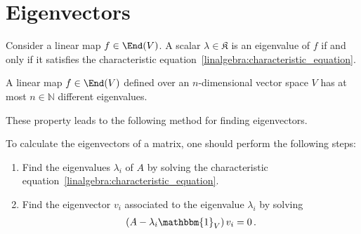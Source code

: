 \section{Eigenvectors}


    \begin{property}\label{linalgebra:eigenvalue_characteristic_equation}
        Consider a linear map $f\in\End(V)$. A scalar $\lambda\in\mathfrak{K}$ is an eigenvalue of $f$ if and only if it satisfies the characteristic equation~\eqref{linalgebra:characteristic_equation}.
    \end{property}
    \begin{property}
        A linear map $f\in\End(V)$ defined over an $n$-dimensional vector space $V$ has at most $n\in\mathbb{N}$ different eigenvalues.
    \end{property}

    These property leads to the following method for finding eigenvectors.
    \begin{method}
        To calculate the eigenvectors of a matrix, one should perform the following steps:
        \begin{enumerate}
            \item Find the eigenvalues $\lambda_i$ of $A$ by solving the characteristic equation~\eqref{linalgebra:characteristic_equation}.
            \item Find the eigenvector $v_i$ associated to the eigenvalue $\lambda_i$ by solving
                \begin{gather}
                    \label{linalgebra:eigenspace}
                    \left(A - \lambda_i\mathbbm{1}_V\right)v_i = 0\,.
                \end{gather}
        \end{enumerate}
    \end{method}


